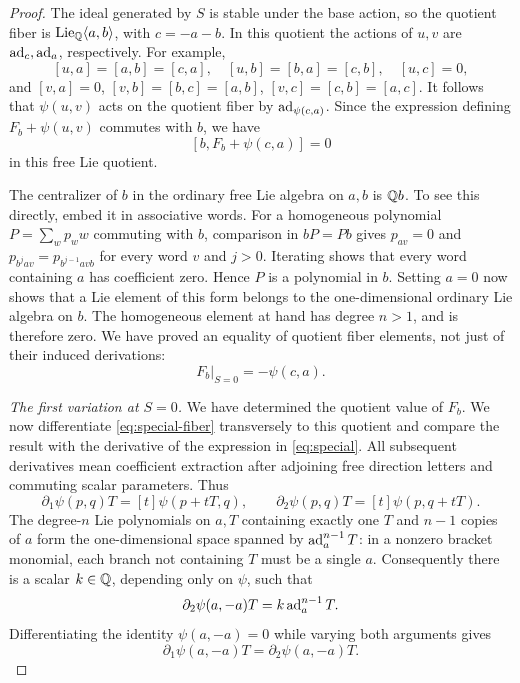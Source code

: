 \begin{proof}
The ideal generated by \(S\) is stable under the base action, so the
quotient fiber is \(\operatorname{Lie}_{\mathbb Q}\langle a,b\rangle\), with
\(c=-a-b\).  In this quotient the actions of \(u,v\) are
\(\operatorname{ad}_c,\operatorname{ad}_a\), respectively.  For example,
\[
 [u,a]=[a,b]=[c,a],\quad [u,b]=[b,a]=[c,b],\quad [u,c]=0,
\]
and
\([v,a]=0\), \([v,b]=[b,c]=[a,b]\),
\([v,c]=[c,b]=[a,c]\).  It follows that \(\psi(u,v)\) acts on
the quotient fiber by \(\operatorname{ad}_{\psi(c,a)}\).  Since the expression
defining \(F_b+\psi(u,v)\) commutes with \(b\), we have
\[
 [b,F_b+\psi(c,a)]=0
\]
in this free Lie quotient.

The centralizer of \(b\) in the ordinary free Lie algebra on \(a,b\)
is \(\mathbb Q b\).  To see this directly, embed it in associative words.
For a homogeneous polynomial \(P=\sum_w p_w w\) commuting with
\(b\), comparison in \(bP=Pb\) gives
\(p_{av}=0\) and
\(p_{b^j av}=p_{b^{j-1}avb}\) for every word \(v\) and \(j>0\).
Iterating shows that every word containing \(a\) has coefficient
zero.  Hence \(P\) is a polynomial in \(b\).  Setting \(a=0\) now shows that a
Lie element of this form belongs to the one-dimensional ordinary
Lie algebra on \(b\).  The homogeneous element at hand has degree
\(n>1\), and is therefore zero.  We have proved an equality of
quotient fiber elements, not just of their induced derivations:
\begin{equation}\label{eq:special-fb}
 F_b\big|_{S=0}=-\psi(c,a).
\end{equation}

\emph{The first variation at \(S=0\).}
We have determined the quotient value of \(F_b\).  We now differentiate
\eqref{eq:special-fiber} transversely to this quotient and compare the
result with the derivative of the expression in \eqref{eq:special}.
All subsequent derivatives mean coefficient
extraction after adjoining free direction letters and commuting
scalar parameters.  Thus
\[
 \partial_1\psi(p,q)T=[t]\psi(p+tT,q),\qquad
 \partial_2\psi(p,q)T=[t]\psi(p,q+tT).
\]
The degree-\(n\) Lie polynomials on \(a,T\) containing exactly one
\(T\) and \(n-1\) copies of \(a\) form the one-dimensional space
spanned by \(\operatorname{ad}_a^{n-1}T\): in a nonzero bracket monomial, each
branch not containing \(T\) must be a single \(a\).  Consequently
there is a scalar \(k\in\mathbb Q\), depending only on \(\psi\), such that
\begin{equation}\label{eq:special-k}
 \partial_2\psi(a,-a)T=k\operatorname{ad}_a^{n-1}T.
\end{equation}
Differentiating the identity \(\psi(a,-a)=0\) while varying both
arguments gives
\begin{equation}\label{eq:special-diagonal}
 \partial_1\psi(a,-a)T=\partial_2\psi(a,-a)T.
\end{equation}


\end{proof}
